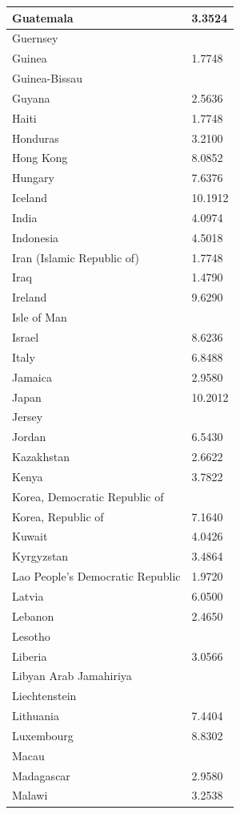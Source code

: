 \documentclass[12pt]{article}
\begin{document}
\begin{longtable}{|p{}|p{}|}
Guatemala&3.3524 \\\hline
Guernsey& \\\hline
Guinea&1.7748 \\\hline
Guinea-Bissau& \\\hline
Guyana&2.5636 \\\hline
Haiti&1.7748 \\\hline
Honduras&3.2100 \\\hline
Hong Kong&8.0852 \\\hline
Hungary&7.6376 \\\hline
Iceland&10.1912 \\\hline
India&4.0974 \\\hline
Indonesia&4.5018 \\\hline
Iran (Islamic Republic of)&1.7748 \\\hline
Iraq&1.4790 \\\hline
Ireland&9.6290 \\\hline
Isle of Man& \\\hline
Israel&8.6236 \\\hline
Italy&6.8488 \\\hline
Jamaica&2.9580 \\\hline
Japan&10.2012 \\\hline
Jersey& \\\hline
Jordan&6.5430 \\\hline
Kazakhstan&2.6622 \\\hline
Kenya&3.7822 \\\hline
Korea, Democratic Republic of& \\\hline
Korea, Republic of&7.1640 \\\hline
Kuwait&4.0426 \\\hline
Kyrgyzstan&3.4864 \\\hline
Lao People's Democratic Republic&1.9720 \\\hline
Latvia&6.0500 \\\hline
Lebanon&2.4650 \\\hline
Lesotho& \\\hline
Liberia&3.0566 \\\hline
Libyan Arab Jamahiriya& \\\hline
Liechtenstein& \\\hline
Lithuania&7.4404 \\\hline
Luxembourg&8.8302 \\\hline
Macau& \\\hline
Madagascar&2.9580 \\\hline
Malawi&3.2538 \\\hline

\end{longtable}
\end{document}
